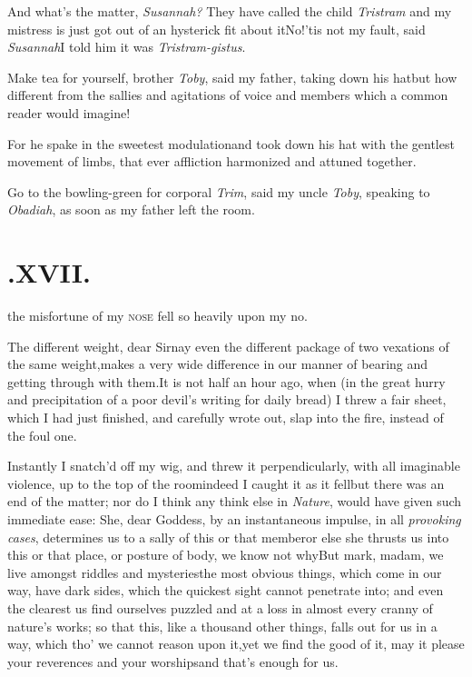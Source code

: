 \documentclass[twoside]{article}
\begin{document}
\tsk And what’s the matter, \textit{Susannah?}\break
They have called the child \textit{Tristram}\tsh\break
and my mistress is just got out of an
hysterick fit about
it\tsk No!\tsk ’tis not my fault, said
\textit{Susannah}\tsk I told him it was \textit{Tristram-gistus}.

\tsh Make tea for yourself, brother \textit{Toby}, said
my father, taking down his hat\tsk but how different from
the sallies and agitations of voice and members which a common
reader would imagine!

\tsk For he spake in the sweetest modulation\tsk and took
down his hat with the\break
gentlest movement of limbs, that ever\break
affliction harmonized and attuned toge\-ther.

\tsk Go to the bowling-green for corpo\-ral \textit{Trim},
said my uncle \textit{Toby}, speaking to \textit{Obadiah}, as soon as
my father left the room.

\null\smallskip
\section{.\enspace XVII.}

 the misfortune of my\break
\textsc{nose} fell so heavily upon my\break
{}
\break
no.

The different weight, dear Sir\tsh nay even the
different package of two vexations of the same
weight,\tsh makes a very wide difference in our manner of
bearing and getting through with them.\tsk It is not half
an hour ago, when (in the great hurry and precipitation of a poor
devil’s writing for daily bread) I threw a fair sheet, which
I had just finished, and carefully wrote out, slap into the fire,
instead of the foul one.

Instantly I snatch’d off my wig, and threw it
perpendicularly, with all imaginable violence, up to the top of the
room\break\tsk indeed I caught it as it fell\tsk but there was
an end of the matter; nor do I think any think else in
\textit{Nature}, would have given such immediate ease: She, dear
Goddess, by an instantaneous impulse, in all \textit{provoking
cases}, determines us to a sally of this or that member\tsk or
else she thrusts us into this or that place, or posture of body, we
know not why\tsk But mark, madam, we live amongst riddles
and mysteries\tsk the most obvious things, which come in
our way, have dark sides, which the quickest sight cannot penetrate
into; and even the clearest 
us find ourselves puzzled and at a loss in almost every cranny of
nature’s works; so that this, like a thousand other things,
falls out for us in a way, which tho’ we cannot reason upon
it,\tsk yet we find the good of it, may it please your reverences
and your worships\tsh and that’s enough for us.
\end{document}
